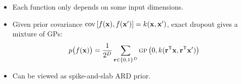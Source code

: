 {\begin{itemize}
	\item Each function only depends on some input dimensions.
	\item Given prior covariance $\operatorname{cov} \left[ f({\bf{x}}), f({\bf{x}}') \right] = k({\bf{x}}, {\bf{x}}')$,
	exact dropout gives a mixture of GPs:$$ p \big( f({\bf{x}}) \big)= \frac{1}{2^D} \sum_{{\bf{r}} \in \{0,1\}^D}  {\textsc{gp}} \left(0, k({\bf{r}}^\mathsf{T} {\bf{x}}, {\bf{r}}^\mathsf{T}{\bf{x}}') \right)$$
	\item Can be viewed as spike-and-slab ARD prior.
\end{itemize}
}


